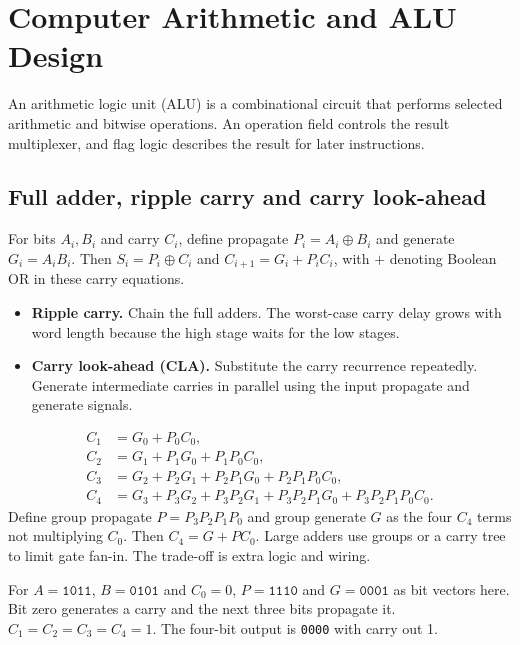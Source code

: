 \documentclass[12pt,a4paper]{article}
\begin{document}
\section{Computer Arithmetic and ALU Design}
\begin{tcolorbox}[defbox,title={Arithmetic logic unit}]
An arithmetic logic unit (ALU) is a combinational circuit that performs selected arithmetic and bitwise operations. An operation field controls the result multiplexer, and flag logic describes the result for later instructions.
\end{tcolorbox}
\subsection{Full adder, ripple carry and carry look-ahead}
For bits $A_i,B_i$ and carry $C_i$, define propagate $P_i=A_i\oplus B_i$ and generate $G_i=A_iB_i$. Then $S_i=P_i\oplus C_i$ and $C_{i+1}=G_i+P_i C_i$, with $+$ denoting Boolean OR in these carry equations.
\begin{itemize}[leftmargin=*,itemsep=3pt]
\item \textbf{Ripple carry.} Chain the full adders. The worst-case carry delay grows with word length because the high stage waits for the low stages.
\item \textbf{Carry look-ahead (CLA).} Substitute the carry recurrence repeatedly. Generate intermediate carries in parallel using the input propagate and generate signals.
\end{itemize}
\[
\begin{aligned}
 C_1&=G_0+P_0C_0,\\
 C_2&=G_1+P_1G_0+P_1P_0C_0,\\
 C_3&=G_2+P_2G_1+P_2P_1G_0+P_2P_1P_0C_0,\\
 C_4&=G_3+P_3G_2+P_3P_2G_1+P_3P_2P_1G_0+P_3P_2P_1P_0C_0 .
\end{aligned}
\]
Define group propagate $P=P_3P_2P_1P_0$ and group generate $G$ as the four $C_4$ terms not multiplying $C_0$. Then $C_4=G+PC_0$. Large adders use groups or a carry tree to limit gate fan-in. The trade-off is extra logic and wiring.
\begin{tcolorbox}[examplebox,title={Trace a carry through a CLA group}]
For $A=\texttt{1011}$, $B=\texttt{0101}$ and $C_0=0$, $P=\texttt{1110}$ and $G=\texttt{0001}$ as bit vectors here. Bit zero generates a carry and the next three bits propagate it. $C_1=C_2=C_3=C_4=1$. The four-bit output is \texttt{0000} with carry out 1.
\end{tcolorbox}
\end{document}
